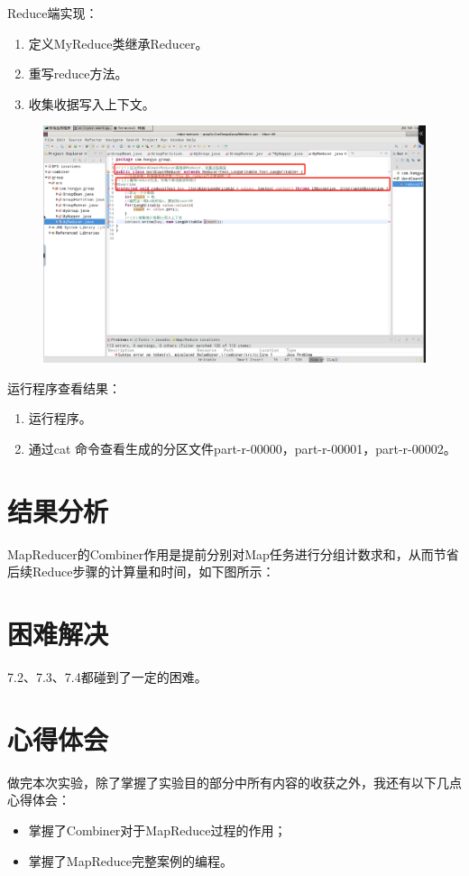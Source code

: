 \documentclass {article}
\begin{document}
				Reduce端实现：
				\begin{enumerate}
					\item 定义MyReduce类继承Reducer。
					\item 重写reduce方法。
					\item 收集收据写入上下文。
				\end{enumerate}
				\begin{figure}[H]
					\centering
					\includegraphics[width=4.5in]{figures/fig26.jpg}
				\end{figure}
			
				运行程序查看结果：
				\begin{enumerate}
					\item 运行程序。
					\item 通过cat 命令查看生成的分区文件part-r-00000，part-r-00001，part-r-00002。
				\end{enumerate}
	
	\section{结果分析}
		MapReducer的Combiner作用是提前分别对Map任务进行分组计数求和，从而节省后续Reduce步骤的计算量和时间，如下图所示：
	
	\section{困难解决}
		7.2、7.3、7.4都碰到了一定的困难。
	
	\section{心得体会}
		做完本次实验，除了掌握了实验目的部分中所有内容的收获之外，我还有以下几点心得体会：
		\begin{itemize}
			\item 掌握了Combiner对于MapReduce过程的作用；
			\item 掌握了MapReduce完整案例的编程。
		\end{itemize}
	
\end{document}
